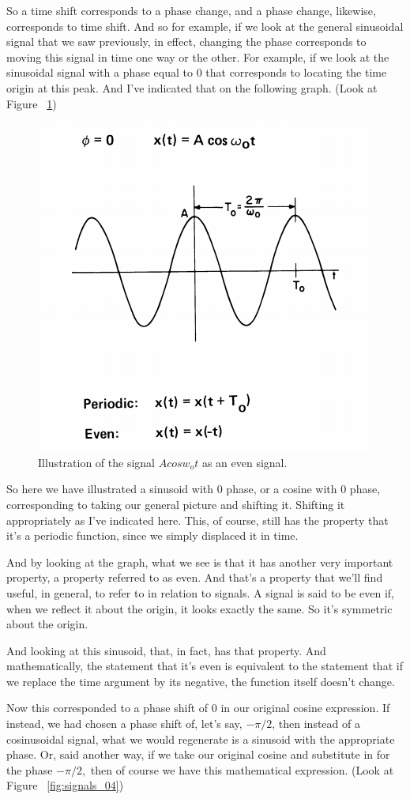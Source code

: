 \documentclass[fleqn,10pt]{olplainarticle}
\theoremstyle{definition}
\theoremstyle{remark}
\begin{document}
So a time shift corresponds to a phase change, and a phase change, likewise, corresponds to time shift. And so for example, if we look at the general sinusoidal signal that we saw previously, in effect, changing the phase corresponds to moving this signal in time one way or the other. For example, if we look at the sinusoidal signal with a phase equal to 0 that corresponds to locating the time origin at this peak. And I've indicated that on the following graph. (Look at Figure ~\ref{fig:signals_03})

\begin{figure}[ht]
\centering
\includegraphics[width=0.45\linewidth]{images/signals_03.png}
\caption{Illustration of the signal $A cos w_o t$ as an even signal.}
\label{fig:signals_03}
\end{figure}

So here we have illustrated a sinusoid with 0 phase, or a cosine with 0 phase, corresponding to taking our general picture and shifting it. Shifting it appropriately as I've indicated here. This, of course, still has the property that it's a periodic function, since we simply displaced it in time.

And by looking at the graph, what we see is that it has another very important property, a property referred to as even. And that's a property that we'll find useful, in general, to refer to in relation to signals. A signal is said to be even if, when we reflect it about the origin, it looks exactly the same. So it's symmetric about the origin.

And looking at this sinusoid, that, in fact, has that property. And mathematically, the statement that it's even is equivalent to the statement that if we replace the time argument by its negative, the function itself doesn't change.

Now this corresponded to a phase shift of 0 in our original cosine expression. If instead, we had chosen a phase shift of, let's say, $-\pi/2$, then instead of a cosinusoidal signal, what we would regenerate is a sinusoid with the appropriate phase. Or, said another way, if we take our original cosine and substitute in for the phase $-\pi/2,$ then of course we have this mathematical expression. (Look at Figure ~\ref{fig:signals_04})
\end{document}
